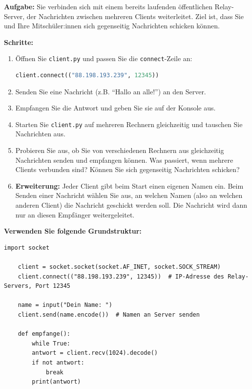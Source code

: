 \begin{myexercise}

    \textbf{Aufgabe:} Sie verbinden sich mit einem bereits laufenden öffentlichen Relay-Server, der Nachrichten zwischen mehreren Clients weiterleitet. Ziel ist, dass Sie und Ihre Mitschüler:innen sich gegenseitig Nachrichten schicken können.

    \textbf{Schritte:}
    \begin{enumerate}
        \item Öffnen Sie \texttt{client.py} und passen Sie die \texttt{connect}-Zeile an:
              \begin{lstlisting}[language=Python]
client.connect(("88.198.193.239", 12345))
\end{lstlisting}
        \item Senden Sie eine Nachricht (z.B. \enquote{Hallo an alle!}) an den Server.
        \item Empfangen Sie die Antwort und geben Sie sie auf der Konsole aus.
        \item Starten Sie \texttt{client.py} auf mehreren Rechnern gleichzeitig und tauschen Sie Nachrichten aus.
        \item Probieren Sie aus, ob Sie von verschiedenen Rechnern aus gleichzeitig Nachrichten senden und empfangen können. Was passiert, wenn mehrere Clients verbunden sind? Können Sie sich gegenseitig Nachrichten schicken?
        \item \textbf{Erweiterung:} Jeder Client gibt beim Start einen eigenen Namen ein. Beim Senden einer Nachricht wählen Sie aus, an welchen Namen (also an welchen anderen Client) die Nachricht geschickt werden soll. Die Nachricht wird dann nur an diesen Empfänger weitergeleitet.

    \end{enumerate}

    \textbf{Verwenden Sie folgende Grundstruktur:}

    \begin{lstlisting}[caption={client.py}]
    import socket

    client = socket.socket(socket.AF_INET, socket.SOCK_STREAM)
    client.connect(("88.198.193.239", 12345))  # IP-Adresse des Relay-Servers, Port 12345

    name = input("Dein Name: ")
    client.send(name.encode())  # Namen an Server senden

    def empfange():
        while True:
        antwort = client.recv(1024).decode()
        if not antwort:
            break
        print(antwort)


\end{lstlisting}
\end{myexercise}
